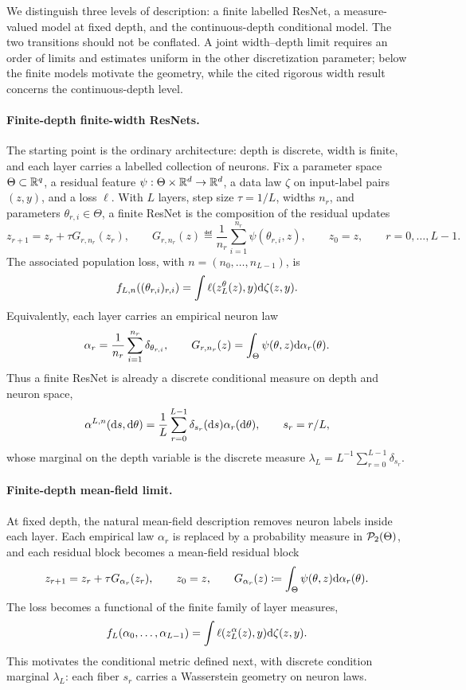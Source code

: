 We distinguish three levels of description: a finite labelled ResNet, a measure-valued model at fixed depth, and the continuous-depth conditional model. The two transitions should not be conflated. A joint width--depth limit requires an order of limits and estimates uniform in the other discretization parameter; below the finite models motivate the geometry, while the cited rigorous width result concerns the continuous-depth level.

\paragraph{Finite-depth finite-width ResNets.}
The starting point is the ordinary architecture: depth is discrete, width is finite, and each layer carries a labelled collection of neurons. Fix a parameter space $\Theta\subset\mathbb{R}^q$, a residual feature $\psi:\Theta\times\mathbb{R}^d\to\mathbb{R}^d$, a data law $\zeta$ on input-label pairs $(z,y)$, and a loss $\ell$. With $L$ layers, step size $\tau=1/L$, widths $n_r$, and parameters $\theta_{r,i}\in\Theta$, a finite ResNet is the composition of the residual updates
\begin{equation}\label{eq-finite-resnet}
	z_{r+1}
	=
	z_r+\tau G_{r,n_r}(z_r),
	\qquad
	G_{r,n_r}(z)
	\eqdef
	\frac1{n_r}\sum_{i=1}^{n_r}\psi(\theta_{r,i},z),
	\qquad
	z_0=z,\qquad r=0,\ldots,L-1.
\end{equation}
The associated population loss, with $n=(n_0,\ldots,n_{L-1})$, is
\[
	f_{L,n}((\theta_{r,i})_{r,i})
	=
	\int \ell(z_L^{\theta}(z),y)\mathrm{d}\zeta(z,y).
\]
Equivalently, each layer carries an empirical neuron law
\[
	\alpha_r
	=
	\frac1{n_r}\sum_{i=1}^{n_r}\delta_{\theta_{r,i}},
	\qquad
	G_{r,n_r}(z)
	=
	\int_\Theta\psi(\theta,z)\mathrm{d}\alpha_r(\theta).
\]
Thus a finite ResNet is already a discrete conditional measure on depth and neuron space,
\[
	\alpha^{L,n}(\mathrm{d} s,\mathrm{d}\theta)
	=
	\frac1L\sum_{r=0}^{L-1}\delta_{s_r}(\mathrm{d} s)\alpha_r(\mathrm{d}\theta),
	\qquad
	s_r=r/L,
\]
whose marginal on the depth variable is the discrete measure $\lambda_L=L^{-1}\sum_{r=0}^{L-1}\delta_{s_r}$.

\paragraph{Finite-depth mean-field limit.}
At fixed depth, the natural mean-field description removes neuron labels inside each layer. Each empirical law $\alpha_r$ is replaced by a probability measure in $\mathcal{P}_2(\Theta)$, and each residual block becomes a mean-field residual block
\[
	z_{r+1}
	=
	z_r+\tau G_{\alpha_r}(z_r),
	\qquad z_0=z,
	\qquad
	G_{\alpha_r}(z)
	\coloneqq
	\int_\Theta\psi(\theta,z)\mathrm{d}\alpha_r(\theta).
\]
The loss becomes a functional of the finite family of layer measures,
\[
	f_L(\alpha_0,\ldots,\alpha_{L-1})
	=
	\int \ell(z_L^\alpha(z),y)\mathrm{d}\zeta(z,y).
\]
This motivates the conditional metric defined next, with discrete condition marginal $\lambda_L$: each fiber $s_r$ carries a Wasserstein geometry on neuron laws.

